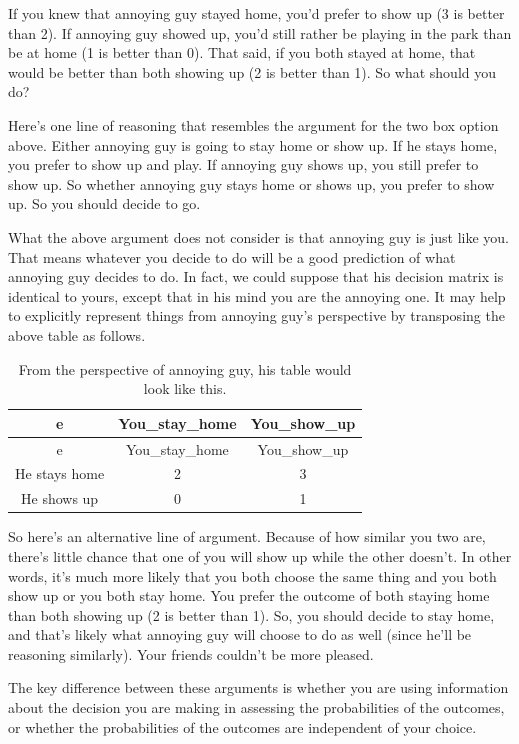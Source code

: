 \documentclass[]{tufte-book}
\begin{document}
If you knew that annoying guy stayed home, you'd prefer to show up (3 is better than 2). If annoying guy showed up, you'd still rather be playing in the park than be at home (1 is better than 0). That said, if you both stayed at home, that would be better than both showing up (2 is better than 1). So what should you do?

Here's one line of reasoning that resembles the argument for the two box option above. Either annoying guy is going to stay home or show up. If he stays home, you prefer to show up and play. If annoying guy shows up, you still prefer to show up. So whether annoying guy stays home or shows up, you prefer to show up. So you should decide to go.

What the above argument does not consider is that annoying guy is just like you. That means whatever you decide to do will be a good prediction of what annoying guy decides to do. In fact, we could suppose that his decision matrix is identical to yours, except that in his mind you are the annoying one. It may help to explicitly represent things from annoying guy's perspective by transposing the above table as follows.

\begin{longtable}[]{@{}ccc@{}}
\caption{\label{tab:unnamed-chunk-3}From the perspective of annoying guy, his table would look like this.}\tabularnewline
\toprule
e & You\_stay\_home & You\_show\_up\tabularnewline
\midrule
\endfirsthead
\toprule
e & You\_stay\_home & You\_show\_up\tabularnewline
\midrule
\endhead
He stays home & 2 & 3\tabularnewline
He shows up & 0 & 1\tabularnewline
\bottomrule
\end{longtable}

So here's an alternative line of argument. Because of how similar you two are, there's little chance that one of you will show up while the other doesn't. In other words, it's much more likely that you both choose the same thing and you both show up or you both stay home. You prefer the outcome of both staying home than both showing up (2 is better than 1). So, you should decide to stay home, and that's likely what annoying guy will choose to do as well (since he'll be reasoning similarly). Your friends couldn't be more pleased.

The key difference between these arguments is whether you are using information about the decision you are making in assessing the probabilities of the outcomes, or whether the probabilities of the outcomes are independent of your choice.
\end{document}
